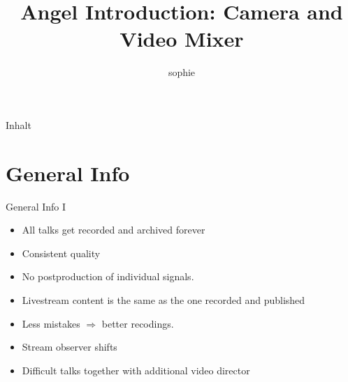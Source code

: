\documentclass[aspectratio=169]{beamer}
\title{Angel Introduction: Camera and Video Mixer}
\author{sophie}
\institute{C3VOC}
\begin{document}

\maketitle

\begin{frame}{Inhalt}
\tableofcontents
\end{frame}


\newpage





\section{General Info}
\begin{frame}{General Info I}
	\begin{itemize}
		\item All talks get recorded and archived forever
		\item Consistent quality
		\item No postproduction of individual signals.
		\item Livestream content is the same as the one recorded and published
		\item Less mistakes $\Rightarrow$ better recodings.
		\item Stream observer shifts
		\item Difficult talks together with additional video director
	\end{itemize}
\end{frame}
\end{document}
